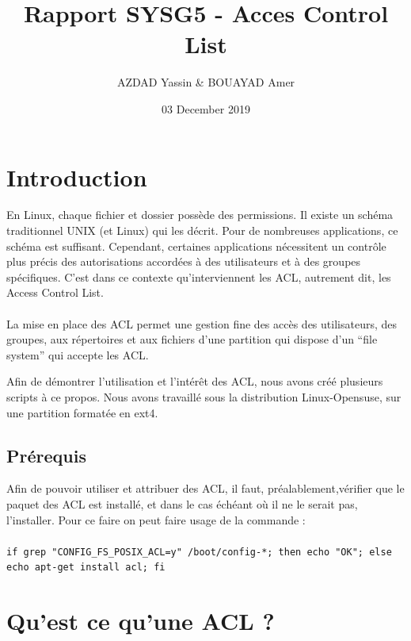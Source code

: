 \documentclass{article}
\title{Rapport SYSG5 - Acces Control List}
\author{AZDAD Yassin & BOUAYAD Amer }
\date{03 December 2019}
\begin{document}
\maketitle
\newpage

\tableofcontents

\newpage

\section{Introduction}
En Linux, chaque fichier et dossier possède des permissions. Il existe un schéma traditionnel UNIX (et Linux) qui les décrit. Pour de nombreuses applications, ce schéma est suffisant. Cependant, certaines applications nécessitent un contrôle plus précis des autorisations accordées à des utilisateurs et à des groupes spécifiques. C'est dans ce contexte qu'interviennent les ACL, autrement dit, les Access Control List.\\\\
La mise en place des ACL permet une gestion fine des accès des utilisateurs, des groupes, aux répertoires et aux fichiers d'une partition qui dispose d'un “file system” qui accepte les ACL.

Afin de démontrer l'utilisation et l'intérêt des ACL, nous avons créé plusieurs scripts à ce propos. Nous avons travaillé sous la distribution Linux-Opensuse, sur une partition formatée en ext4.

\subsection{Prérequis}
Afin de pouvoir utiliser et attribuer des ACL, il faut, préalablement,vérifier que le paquet des ACL est installé, et dans le cas échéant où il ne le serait pas, l'installer. Pour ce faire on peut faire usage de la commande :\\\\
\texttt{if grep "CONFIG\_FS\_POSIX\_ACL=y" /boot/config-*; then echo "OK"; else echo apt-get install acl; fi}

\section{Qu'est ce qu'une ACL ?}
\end{document}
